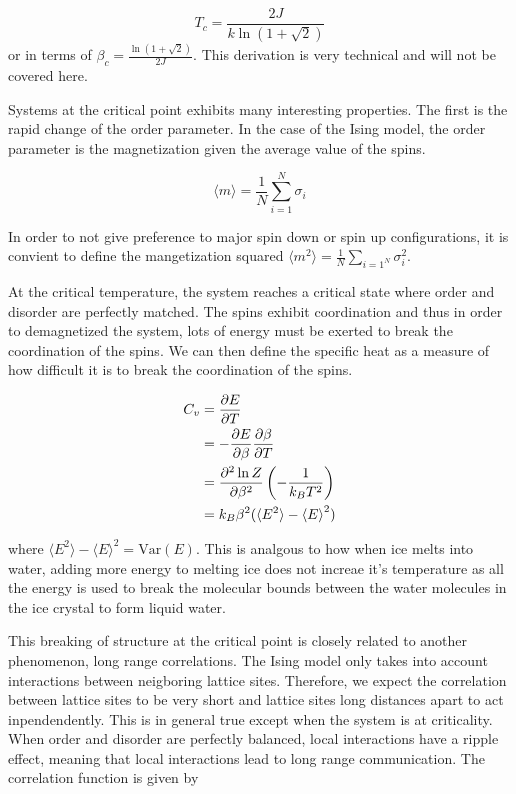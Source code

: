 \documentclass{article}
\begin{document}
\begin{equation} \label{eq:eq24}
    T_c = \frac{2J}{k \ln(1 + \sqrt2)}
\end{equation}
or in terms of $\beta_c = \frac{\ln(1 + \sqrt2)}{2J}$. This derivation is very technical and will not be covered here.




Systems at the critical point exhibits many interesting properties. The first is the rapid change of the order parameter.
In the case of the Ising model, the order parameter is the magnetization given the average value of the spins.

\begin{equation}
    \langle m \rangle = \frac1N \sum_{i=1}^N \sigma_i
\end{equation}

In order to not give preference to major spin down or spin up configurations, it is convient to define the mangetization squared
$\langle m^2 \rangle = \frac1N \sum_{i=1^N} \sigma_i^2$.

At the critical temperature, the system reaches a critical state where order and disorder are perfectly matched.
The spins exhibit coordination and thus in order to demagnetized the system, lots of energy must be exerted to break the coordination of the spins.
We can then define the specific heat as a measure of how difficult it is to break the coordination of the spins.

\begin{align}
    C_v &= \pdv{E}{T} \\
    &= -\pdv{E}{\beta} \pdv{\beta}{T} \\
    &= \pdv[2]{\ln Z}{\beta} \left( - \frac{1}{k_B T^2} \right) \\
    &= k_B \beta^2 ( \langle E^2 \rangle - { \langle E \rangle }^2 )
\end{align}

where $\langle E^2 \rangle - { \langle E \rangle }^2 = \mathrm{Var}(E)$. This is analgous to how when ice melts into water, 
adding more energy to melting ice does not increae it's temperature as all the energy is used to break the molecular bounds between 
the water molecules in the ice crystal to form liquid water. 

This breaking of structure at the critical point is closely related to another phenomenon, long range correlations. The Ising model only takes into account
interactions between neigboring lattice sites. Therefore, we expect the correlation between lattice sites to be very short and lattice sites
long distances apart to act inpendendently. This is in general true except when the system is at criticality. When order and disorder
are perfectly balanced, local interactions have a ripple effect, meaning that local interactions lead to long range communication. The correlation function is given by
\end{document}
